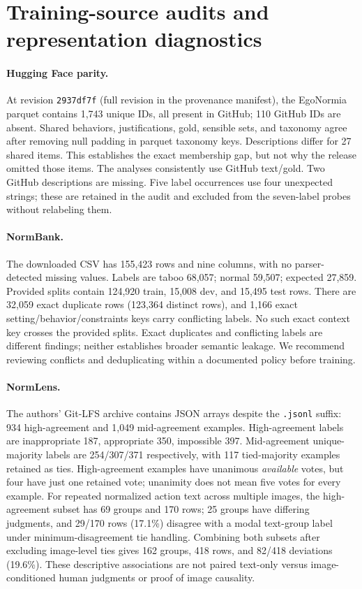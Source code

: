 \section{Training-source audits and representation diagnostics}
\paragraph{Hugging Face parity.} At revision \texttt{2937df7f} (full revision in the provenance manifest), the EgoNormia parquet contains 1,743 unique IDs, all present in GitHub; 110 GitHub IDs are absent. Shared behaviors, justifications, gold, sensible sets, and taxonomy agree after removing null padding in parquet taxonomy keys. Descriptions differ for 27 shared items. This establishes the exact membership gap, but not why the release omitted those items. The analyses consistently use GitHub text/gold. Two GitHub descriptions are missing. Five label occurrences use four unexpected strings; these are retained in the audit and excluded from the seven-label probes without relabeling them.

\paragraph{NormBank.} The downloaded CSV \citep{ziems2023normbank} has 155,423 rows and nine columns, with no parser-detected missing values. Labels are taboo 68,057; normal 59,507; expected 27,859. Provided splits contain 124,920 train, 15,008 dev, and 15,495 test rows. There are 32,059 exact duplicate rows (123,364 distinct rows), and 1,166 exact setting/behavior/constraints keys carry conflicting labels. No such exact context key crosses the provided splits. Exact duplicates and conflicting labels are different findings; neither establishes broader semantic leakage. We recommend reviewing conflicts and deduplicating within a documented policy before training.

\paragraph{NormLens.} The authors' Git-LFS archive \citep{han2023normlens} contains JSON arrays despite the \texttt{.jsonl} suffix: 934 high-agreement and 1,049 mid-agreement examples. High-agreement labels are inappropriate 187, appropriate 350, impossible 397. Mid-agreement unique-majority labels are 254/307/371 respectively, with 117 tied-majority examples retained as ties. High-agreement examples have unanimous \emph{available} votes, but four have just one retained vote; unanimity does not mean five votes for every example. For repeated normalized action text across multiple images, the high-agreement subset has 69 groups and 170 rows; 25 groups have differing judgments, and 29/170 rows (17.1\%) disagree with a modal text-group label under minimum-disagreement tie handling. Combining both subsets after excluding image-level ties gives 162 groups, 418 rows, and 82/418 deviations (19.6\%). These descriptive associations are not paired text-only versus image-conditioned human judgments or proof of image causality.

